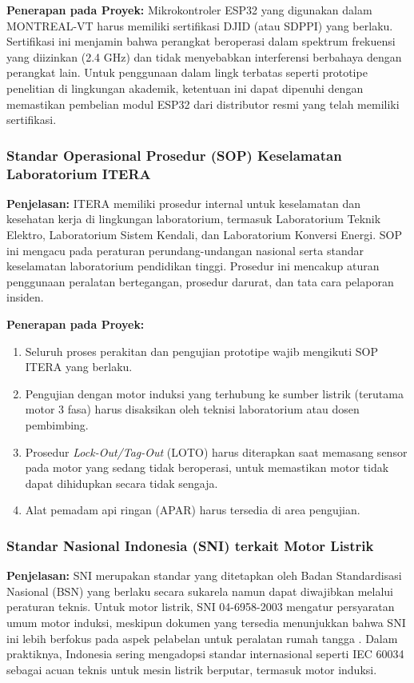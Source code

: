 \documentclass{elsinta}
\begin{document}
\textbf{Penerapan pada Proyek:} Mikrokontroler ESP32 yang digunakan dalam MONTREAL-VT harus memiliki sertifikasi DJID (atau SDPPI) yang berlaku. Sertifikasi ini menjamin bahwa perangkat beroperasi dalam spektrum frekuensi yang diizinkan (2.4 GHz) dan tidak menyebabkan interferensi berbahaya dengan perangkat lain. Untuk penggunaan dalam lingk terbatas seperti prototipe penelitian di lingkungan akademik, ketentuan ini dapat dipenuhi dengan memastikan pembelian modul ESP32 dari distributor resmi yang telah memiliki sertifikasi.

\subsubsection{Standar Operasional Prosedur (SOP) Keselamatan Laboratorium ITERA}

\textbf{Penjelasan:} ITERA memiliki prosedur internal untuk keselamatan dan kesehatan kerja di lingkungan laboratorium, termasuk Laboratorium Teknik Elektro, Laboratorium Sistem Kendali, dan Laboratorium Konversi Energi. SOP ini mengacu pada peraturan perundang-undangan nasional serta standar keselamatan laboratorium pendidikan tinggi. Prosedur ini mencakup aturan penggunaan peralatan bertegangan, prosedur darurat, dan tata cara pelaporan insiden.

\textbf{Penerapan pada Proyek:}
\begin{enumerate}
    \item Seluruh proses perakitan dan pengujian prototipe wajib mengikuti SOP ITERA yang berlaku.
    \item Pengujian dengan motor induksi yang terhubung ke sumber listrik (terutama motor 3 fasa) harus disaksikan oleh teknisi laboratorium atau dosen pembimbing.
    \item Prosedur \textit{Lock-Out/Tag-Out} (LOTO) harus diterapkan saat memasang sensor pada motor yang sedang tidak beroperasi, untuk memastikan motor tidak dapat dihidupkan secara tidak sengaja.
    \item Alat pemadam api ringan (APAR) harus tersedia di area pengujian.
\end{enumerate}

\subsubsection{Standar Nasional Indonesia (SNI) terkait Motor Listrik}

\textbf{Penjelasan:} SNI merupakan standar yang ditetapkan oleh Badan Standardisasi Nasional (BSN) yang berlaku secara sukarela namun dapat diwajibkan melalui peraturan teknis. Untuk motor listrik, SNI 04-6958-2003 mengatur persyaratan umum motor induksi, meskipun dokumen yang tersedia menunjukkan bahwa SNI ini lebih berfokus pada aspek pelabelan untuk peralatan rumah tangga \cite{BadanStandardisasiNasional2003}. Dalam praktiknya, Indonesia sering mengadopsi standar internasional seperti IEC 60034 sebagai acuan teknis untuk mesin listrik berputar, termasuk motor induksi.
\end{document}
